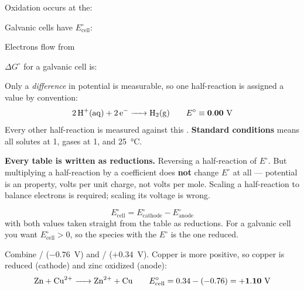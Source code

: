 \documentclass{apchem-notes}
\begin{document}

\begin{warmup}[4]
  \item Oxidation occurs at the: 
  \item Galvanic cells have $E^\circ_{\text{cell}}$:
  \item Electrons flow from 
  \item $\Delta G^\circ$ for a galvanic cell is:
\end{warmup}



Only a \emph{difference} in potential is measurable, so one half-reaction is
assigned a value by convention:
\[ \ce{2H+(aq) + 2e^- -> H2(g)} \qquad E^\circ \equiv \mathbf{0.00}~\text{V} \]
Every other half-reaction is measured against this
. \textbf{Standard conditions} means all
solutes at \SI{1}{\Molar}, gases at \SI{1}{\atm}, and \SI{25}{\celsius}.

\begin{apctrap}
\textbf{Every table is written as reductions.} Reversing a half-reaction
 of $E^\circ$. But multiplying a
half-reaction by a coefficient does \textbf{not} change $E^\circ$ at all ---
potential is an  property, volts per unit charge, not volts
per mole. Scaling a half-reaction to balance electrons is required; scaling
its voltage is wrong.
\end{apctrap}

\[ \boxed{\;E^\circ_{\text{cell}} = E^\circ_{\text{cathode}}
   - E^\circ_{\text{anode}}\;} \]
with both values taken straight from the table as reductions. For a
galvanic cell you want $E^\circ_{\text{cell}} > 0$, so the species with the
 $E^\circ$ is the one reduced.

\begin{workedexample}
Combine / ($-0.76$~V) and / ($+0.34$~V).
Copper is more positive, so copper is reduced (cathode) and zinc oxidized
(anode):
\[ \ce{Zn + Cu^2+ -> Zn^2+ + Cu} \qquad
   E^\circ_{\text{cell}} = 0.34 - (-0.76) = \mathbf{+1.10}~\text{V} \]
\end{workedexample}
\end{document}
